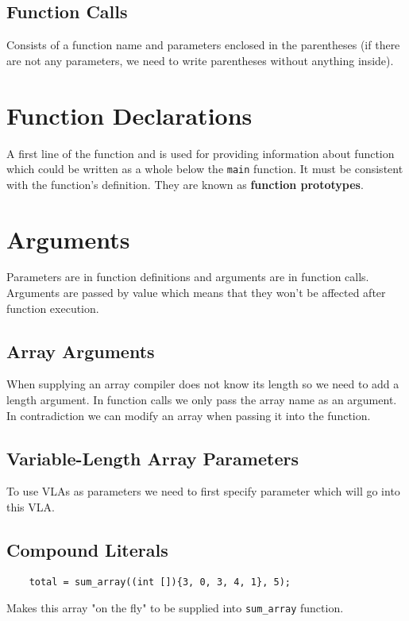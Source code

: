 \documentclass[openany]{book}
\begin{document}
    \subsection*{Function Calls}
    Consists of a function name and parameters enclosed in the parentheses (if there are not any parameters, we need to write parentheses without anything inside).

    \section{Function Declarations}
    A first line of the function and is used for providing information about function which could be written as a whole below the \texttt{main} function. It must be consistent with the function's definition. They are known as \textbf{function prototypes}. 

    \section{Arguments}
    Parameters are in function definitions and arguments are in function calls. Arguments are passed by value which means that they won't be affected after function execution. 

    \subsection*{Array Arguments}
    When supplying an array compiler does not know its length so we need to add a length argument. In function calls we only pass the array name as an argument. In contradiction we can modify an array when passing it into the function.

    \subsection*{Variable-Length Array Parameters}
    To use VLAs as parameters we need to first specify parameter which will go into this VLA.

    \subsection*{Compound Literals}
    \begin{lstlisting}
    total = sum_array((int []){3, 0, 3, 4, 1}, 5);
    \end{lstlisting}
    Makes this array "on the fly" to be supplied into \texttt{sum\_array} function.
\end{document}
